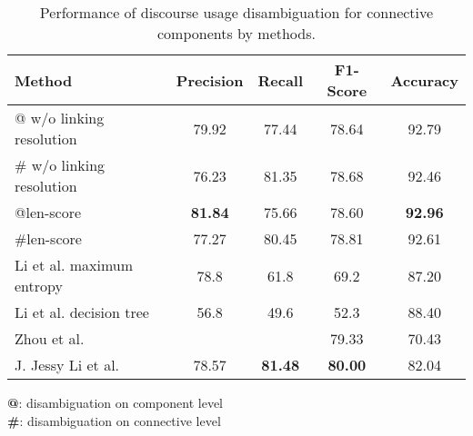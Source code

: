 \begin{table}[ht]
\centering
\begin{tabular}{|l|c|c|c|c|}
\hline

\bf Method                    & \bf Precision & \bf Recall & \bf F1-Score & \bf Accuracy \\ \hline
    @ w/o linking resolution  &     79.92     &     77.44  &     78.64    &     92.79    \\ \hline
    \# w/o linking resolution &     76.23     &     81.35  &     78.68    &     92.46    \\ \hline
    @len-score                & \bf 81.84     &     75.66  &     78.60    & \bf 92.96    \\ \hline
    \#len-score               &     77.27     &     80.45  &     78.81    &     92.61    \\

\hhline{|=|=|=|=|=|}

    Li et al. maximum entropy &     78.8      &     61.8   &     69.2     &     87.20    \\ \hline
    Li et al. decision tree   &     56.8      &     49.6   &     52.3     &     88.40    \\

\hhline{|=|=|=|=|=|}

    Zhou et al.               &               &            &     79.33    &     70.43    \\ \hline
    J. Jessy Li et al.        &     78.57     & \bf 81.48  & \bf 80.00    &     82.04    \\ \hline

\end{tabular}
\begin{flushleft}
\small
\textbf{@}: disambiguation on component level \\
\textbf{\#}: disambiguation on connective level \\
\end{flushleft}
\caption{\label{t:recognition-methods} Performance of discourse usage
disambiguation for connective components by methods. }
\end{table}

